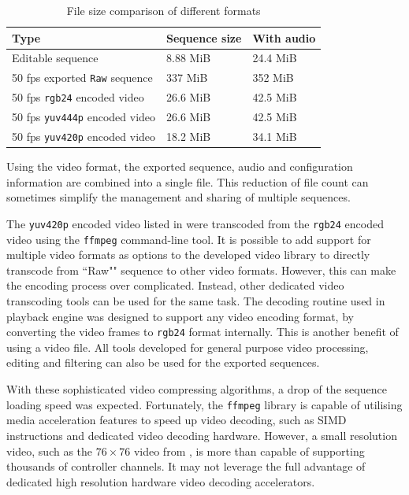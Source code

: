 \begin{table}[t]
  \centering
  \begin{tabular}{l|l|l}
    \hline
    \textbf{Type} & \textbf{Sequence size} & \textbf{With audio} \\
    \hline
    Editable sequence                     & 8.88 MiB  & 24.4 MiB  \\ \hline
    50 fps exported \texttt{Raw} sequence & 337 MiB   & 352 MiB   \\ \hline
    50 fps \texttt{rgb24} encoded video   & 26.6 MiB  & 42.5 MiB  \\ \hline
    50 fps \texttt{yuv444p} encoded video & 26.6 MiB  & 42.5 MiB  \\ \hline
    50 fps \texttt{yuv420p} encoded video & 18.2 MiB  & 34.1 MiB  \\ \hline
  \end{tabular}
  \caption{\footnotesize File size comparison of different formats}
  \label{tbl:size}
\end{table}

Using the video format, the exported sequence, audio and configuration information are combined into a single file. This reduction of file count can sometimes simplify the management and sharing of multiple sequences.


The \texttt{yuv420p} encoded video listed in  were transcoded from the \texttt{rgb24} encoded video using the \texttt{ffmpeg} command-line tool. It is possible to add support for multiple video formats as options to the developed video library to directly transcode from ``Raw"" sequence to other video formats. However, this can make the encoding process over complicated. Instead, other dedicated video transcoding tools can be used for the same task. The decoding routine used in playback engine was designed to support any video encoding format, by converting the video frames to \texttt{rgb24} format internally. This is another benefit of using a video file. All tools developed for general purpose video processing, editing and filtering can also be used for the exported sequences.

With these sophisticated video compressing algorithms, a drop of the sequence loading speed was expected. Fortunately, the \texttt{ffmpeg} library is capable of utilising media acceleration features to speed up video decoding, such as SIMD instructions and dedicated video decoding hardware. However, a small resolution video, such as the $76 \times 76$ video from , is more than capable of supporting thousands of controller channels. It may not leverage the full advantage of dedicated high resolution hardware video decoding accelerators.


